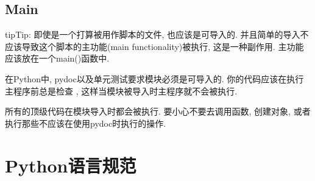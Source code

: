 \documentclass[a4paper,10pt,english]{sphinxmanual}
\begin{document}
\section{Main}
\label{\detokenize{python_style_rules:main}}\label{\detokenize{python_style_rules:id17}}
\begin{sphinxadmonition}{tip}{Tip:}
即使是一个打算被用作脚本的文件, 也应该是可导入的. 并且简单的导入不应该导致这个脚本的主功能(main functionality)被执行, 这是一种副作用. 主功能应该放在一个main()函数中.
\end{sphinxadmonition}

在Python中, pydoc以及单元测试要求模块必须是可导入的. 你的代码应该在执行主程序前总是检查  , 这样当模块被导入时主程序就不会被执行.

%
\begin{sphinxVerbatim}[commandchars=\\\{\}]
 

   
\end{sphinxVerbatim}

所有的顶级代码在模块导入时都会被执行. 要小心不要去调用函数, 创建对象, 或者执行那些不应该在使用pydoc时执行的操作.


\chapter{Python语言规范}
\label{\detokenize{python_language_rules:python}}\label{\detokenize{python_language_rules::doc}}
\end{document}
